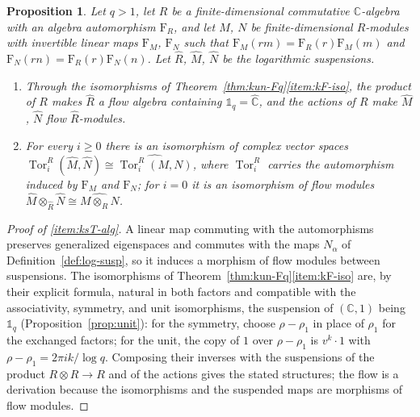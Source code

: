\documentclass[11pt]{amsart}
\theoremstyle{plain}
\newtheorem{proposition}[theorem]{Proposition}
\theoremstyle{definition}
\theoremstyle{remark}
\numberwithin{equation}{section}
\newcommand{\C}{\mathbb{C}}
\begin{document}
\begin{proposition}\label{prop:kun-susp-tor}
Let $q>1$, let $R$ be a finite-dimensional commutative $\C$-algebra with
an algebra automorphism $\mathrm F_R$, and let $M$, $N$ be
finite-dimensional $R$-modules with invertible linear maps
$\mathrm F_M$, $\mathrm F_N$ such that $\mathrm F_M(rm)=\mathrm F_R(r)
\mathrm F_M(m)$ and $\mathrm F_N(rn)=\mathrm F_R(r)\mathrm F_N(n)$.
Let $\widehat R$, $\widehat M$, $\widehat N$ be the logarithmic
suspensions.
\begin{enumerate}[label=(\roman*)]
\item\label{item:ksT-alg} Through the isomorphisms of
  Theorem~\ref{thm:kun-Fq}\ref{item:kF-iso}, the product of $R$ makes
  $\widehat R$ a flow algebra containing $\mathbb 1_q=\widehat{\C}$,
  and the actions of $R$ make $\widehat M$, $\widehat N$ flow
  $\widehat R$-modules.
\item\label{item:ksT-tor} For every $i\ge0$ there is an isomorphism of
  complex vector spaces
  $\operatorname{Tor}_i^{\widehat R}(\widehat M,\widehat N)\cong
  \widehat{\operatorname{Tor}_i^R(M,N)}$, where $\operatorname{Tor}_i^R$
  carries the automorphism induced by $\mathrm F_M$ and $\mathrm F_N$;
  for $i=0$ it is an isomorphism of flow modules
  $\widehat M\otimes_{\widehat R}\widehat N\cong\widehat{M\otimes_RN}$.
\end{enumerate}
\end{proposition}

\begin{proof}[Proof of \ref{item:ksT-alg}]
A linear map commuting with the automorphisms preserves generalized
eigenspaces and commutes with the maps $N_\alpha$ of
Definition~\ref{def:log-susp}, so it induces a morphism of flow
modules between suspensions. The isomorphisms of
Theorem~\ref{thm:kun-Fq}\ref{item:kF-iso} are, by their explicit
formula, natural in both factors and compatible with the associativity,
symmetry, and unit isomorphisms, the suspension of $(\C,1)$ being
$\mathbb 1_q$ (Proposition~\ref{prop:unit}): for the symmetry, choose
$\rho-\rho_1$ in place of $\rho_1$ for the exchanged factors; for the
unit, the copy of $1$ over $\rho-\rho_1$ is $v^k\cdot1$ with
$\rho-\rho_1=2\pi ik/\log q$. Composing their inverses
with the suspensions of the product $R\otimes R\to R$ and of the
actions gives the stated structures; the flow is a derivation because
the isomorphisms and the suspended maps are morphisms of flow modules.
\end{proof}
\end{document}
